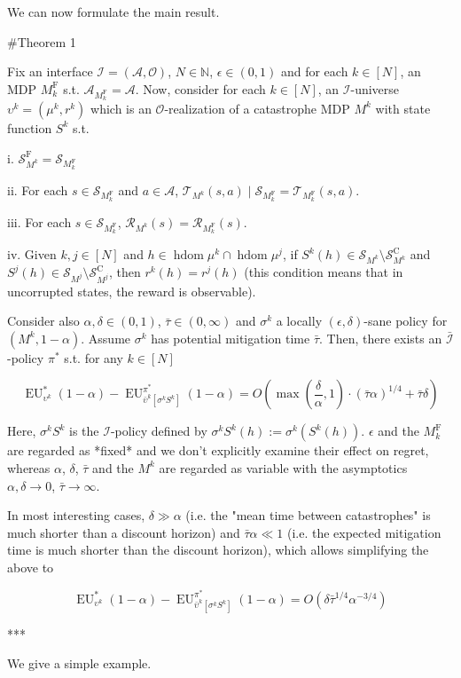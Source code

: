 \documentclass[a4paper]{article}
\newcommand{\AP}[1]{\left(#1\right)}
\newcommand{\AB}[1]{\left[#1\right]}
\newcommand{\Nats}{\mathbb{N}}
\newcommand{\Ob}{\mathcal{O}}
\newcommand{\A}{\mathcal{A}}
\newcommand{\St}{\mathcal{S}}
\newcommand{\T}{\mathcal{T}}
\newcommand{\R}{\mathcal{R}}
\newcommand{\In}{\mathcal{I}}
\newcommand{\Adi}{{\bar{\In}}}
\DeclareMathOperator{\HD}{hdom}
\newcommand{\RMC}{\mathrm{C}}
\newcommand{\RMF}{\mathrm{F}}
\newcommand{\SF}{\St^{\RMF}}
\newcommand{\SC}{\St^{\RMC}}
\newcommand{\MF}{M^{\RMF}}
\newcommand{\EU}{\operatorname{EU}}
\begin{document}
We can now formulate the main result.

\#Theorem 1

Fix an interface $\In=(\A,\Ob)$, $N \in \Nats$, $\epsilon \in (0,1)$ and for each $k \in [N]$, an MDP $\MF_k$ s.t. $\A_{\MF_k} = \A$. Now, consider for each $k \in [N]$, an $\In$-universe $\upsilon^k=(\mu^k,r^k)$ which is an $\Ob$-realization of a catastrophe MDP $M^k$ with state function $S^k$ s.t.

i. $\SF_{M^k} = \St_{\MF_k}$

ii. For each $s \in \St_{\MF_k}$ and $a \in \A$, $\T_{M^k}(s,a) \mid \St_{\MF_k} = \T_{\MF_k}(s,a)$.

iii. For each $s \in \St_{\MF_k}$, $\R_{M^k}(s)=\R_{\MF_k}(s)$.

iv. Given $k,j \in [N]$ and $h \in \HD{\mu^k} \cap \HD{\mu^j}$, if $S^k(h) \in \St_{M^k} \setminus \SC_{M^k}$ and $S^j(h) \in \St_{M^j} \setminus \SC_{M^j}$, then $r^k(h)=r^j(h)$ (this condition means that in uncorrupted states, the reward is observable).

Consider also $\alpha,\delta\in(0,1)$, $\bar{\tau} \in (0,\infty)$ and $\sigma^k$ a locally $(\epsilon,\delta)$-sane policy for $(M^k,1-\alpha)$. Assume $\sigma^k$ has potential mitigation time $\bar{\tau}$. Then, there exists an $\Adi$-policy $\pi^*$ s.t. for any $k \in [N]$

$$\EU_{\upsilon^k}^*(1-\alpha) - \EU_{\bar{\upsilon}^k\AB{\sigma^kS^k}}^{\pi^*}(1-\alpha) = O\AP{\max\AP{\frac{\delta}{\alpha},1}\cdot(\bar{\tau}\alpha)^{1/4}+\bar{\tau}\delta}$$

Here, $\sigma^k S^k$ is the $\In$-policy defined by $\sigma^k S^k(h):=\sigma^k\AP{S^k(h)}$. $\epsilon$ and the $\MF_k$ are regarded as *fixed* and we don't explicitly examine their effect on regret, whereas $\alpha$, $\delta$, $\bar{\tau}$ and the $M^k$ are regarded as variable with the asymptotics $\alpha,\delta \rightarrow 0$, $\bar{\tau} \rightarrow \infty$.

In most interesting cases, $\delta \gg \alpha$ (i.e. the "mean time between catastrophes" is much shorter than a discount horizon) and $\bar{\tau}\alpha \ll 1$ (i.e. the expected mitigation time is much shorter than the discount horizon), which allows simplifying the above to

$$\EU_{\upsilon^k}^*(1-\alpha) - \EU_{\bar{\upsilon}^k\AB{\sigma^kS^k}}^{\pi^*}(1-\alpha) = O\AP{\delta\bar{\tau}^{1/4}\alpha^{-3/4}}$$

***

We give a simple example.
\end{document}
